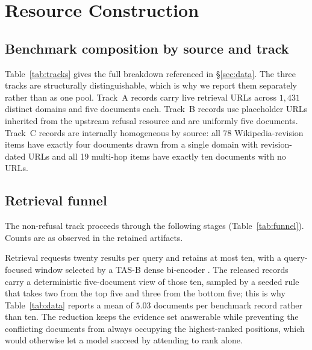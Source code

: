 \appendix

\section{Resource Construction}
\label{app:data}

\subsection{Benchmark composition by source and track}



Table~\ref{tab:tracks} gives the full breakdown referenced in
\S\ref{sec:data}. The three tracks are structurally distinguishable, which is
why we report them separately rather than as one pool. Track~A records carry
live retrieval URLs across $1{,}431$ distinct domains and five documents each.
Track~B records use placeholder URLs inherited from the upstream refusal
resource and are uniformly five documents. Track~C records are internally
homogeneous by source: all 78 Wikipedia-revision items have exactly four
documents drawn from a single domain with revision-dated URLs and all 19
multi-hop items have exactly ten documents with no URLs.

\subsection{Retrieval funnel}

The non-refusal track proceeds through the following stages
(Table~\ref{tab:funnel}). Counts are as observed in the retained artifacts.

Retrieval requests twenty results per query and retains at most ten, with a
query-focused window selected by a TAS-B dense bi-encoder
\citep{hofstatter2021tasb}. The released records carry a deterministic
five-document view of those ten, sampled by a seeded rule that takes two from
the top five and three from the bottom five; this is why Table~\ref{tab:data}
reports a mean of $5.03$ documents per benchmark record rather than ten. The
reduction keeps the evidence set answerable while preventing the conflicting
documents from always occupying the highest-ranked positions, which would
otherwise let a model succeed by attending to rank alone.

